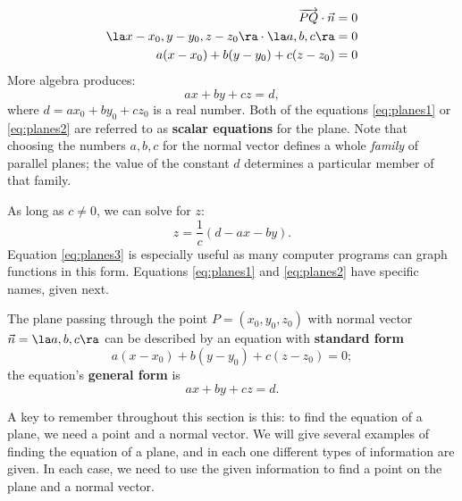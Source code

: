 \begin{align}
  \overrightarrow{PQ}\cdot\vec n &= 0 \notag\\
  \la x-x_0,y-y_0,z-z_0\ra\cdot \la a,b,c\ra &=0\notag\\
  a(x-x_0)+b(y-y_0)+c(z-z_0) &=0 \label{eq:planes1}
\end{align}
More algebra produces:
\begin{equation}\label{eq:planes2}
ax+by+cz =d,
\end{equation}
where $d = ax_0+by_0+cz_0$ is a real number. Both of the equations \eqref{eq:planes1} or \eqref{eq:planes2} are referred to as \textbf{scalar equations} for the plane. Note that choosing the numbers $a, b, c$ for the normal vector defines a whole \textit{family} of parallel planes; the value of the constant $d$ determines a particular member of that family.

As long as $c\neq 0$, we can solve for $z$:
\begin{equation}
z = \frac1c(d-ax-by).\label{eq:planes3}
\end{equation}
Equation \eqref{eq:planes3} is especially useful as many computer programs can graph functions in this form. Equations \eqref{eq:planes1} and \eqref{eq:planes2} have specific names, given next.

{The plane passing through the point $P=(x_0,y_0,z_0)$ with normal vector $\vec n=\la a,b,c\ra$ can be described by an equation with \textbf{standard form} 
\[
a(x-x_0)+b(y-y_0)+c(z-z_0) =0;
\]
the equation's \textbf{general form} is 
\[
ax+by+cz = d.
\]
}

A key to remember throughout this section is this: to find the equation of a plane, we need a point and a normal vector. We will give several examples of finding the equation of a plane, and in each one different types of information are given. In each case, we need to use the given information to find a point on the plane and a normal vector.\\

